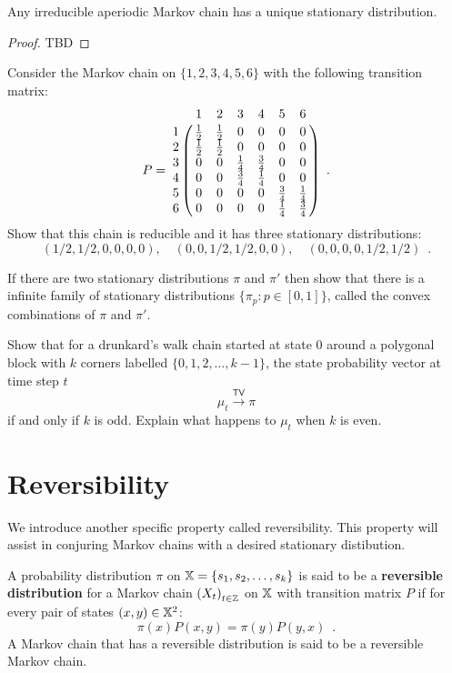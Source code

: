 \begin{prop}\label{P:UniqueStationaryDistrn}
Any irreducible aperiodic Markov chain has a unique stationary distribution.
\begin{proof}
TBD
\end{proof}
\end{prop}


\begin{exercise}\label{EXR:SixStatesWith3Blockof2}
Consider the Markov chain on $\{1,2,3,4,5,6\}$ with the following transition matrix:
\[
P = 
\bordermatrix{ ~ & 1 & 2 & 3 &  4 & 5 & 6 \cr 
1 & \frac{1}{2} & \frac{1}{2} & 0 & 0 & 0 & 0 \cr
2 & \frac{1}{2} & \frac{1}{2} & 0 & 0 & 0 & 0 \cr
3 & 0 & 0 &  \frac{1}{4} & \frac{3}{4} & 0 & 0  \cr
4 & 0 & 0 &  \frac{3}{4} & \frac{1}{4} & 0 & 0  \cr
5 & 0 & 0 &  0 & 0 & \frac{3}{4} & \frac{1}{4}  \cr
6 & 0 & 0 &  0 & 0 & \frac{1}{4} & \frac{3}{4}  } \enspace .
\]
Show that this chain is reducible and it has three stationary distributions:
\[
(1/2,1/2,0,0,0,0), \quad (0,0,1/2,1/2,0,0), \quad (0,0,0,0,1/2,1/2) \enspace .
\]
\end{exercise}

\begin{exercise}\label{EXR:ConvexCombof2StationaryDistrns}
If there are two stationary distributions $\pi$ and $\pi'$ then show that there is a infinite family of stationary distributions $\{\pi_p : p \in [0,1] \}$, called the convex combinations of $\pi$ and $\pi'$.
\end{exercise}

\begin{exercise}\label{EXR:ConvergengeinTVFailsforPeriodicDrunkardWalk}
Show that for a drunkard's walk chain started at state $0$ around a polygonal block with $k$ corners labelled $\{0,1,2,\ldots,k-1\}$, the state probability vector at time step $t$
\[
\mu_t \overset{\mathsf{TV}}{\longrightarrow} \pi   
\]
if and only if $k$ is odd.  Explain what happens to $\mu_t$ when $k$ is even.
\end{exercise}

\section{Reversibility}

We introduce another specific property called reversibility.  
This property will assist in conjuring Markov chains with a desired stationary distibution.

\begin{definition}[Reversible]\label{D:Reversible}
A probability distribution $\pi$ on $\mathbb{X} = \{s_1,s_2,\ldots,s_k\}$ is said to be a {\bf reversible distribution} for a Markov chain $\left(X_t\right)_{t\in \mathbb{Z}}$ on $\mathbb{X}$ with transition matrix $P$ if for every pair of states $(x,y) \in \mathbb{X}^2$:
\begin{equation}\label{E:ReversibilityCondition}
\pi(x) P(x,y) = \pi(y) P(y,x) \enspace .
\end{equation}
A Markov chain that has a reversible distribution is said to be a reversible Markov chain.
\end{definition}

